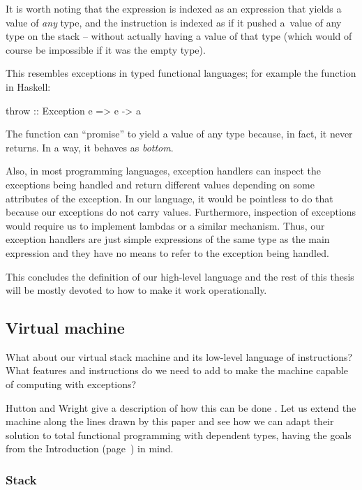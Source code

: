 It is worth noting that the expression  is indexed as an expression
that yields a value of \emph{any} type, and the instruction  is indexed
as if it pushed a~value of any type on the stack -- without actually having a value
of that type (which would of course be impossible if it was the empty type).

This resembles exceptions in typed functional languages; for example the function
 in Haskell:
\begin{code}
  throw :: Exception e => e -> a
\end{code}
The function  can ``promise'' to yield a value of any type because,
in fact, it never returns. In a way, it behaves as \emph{bottom}.

Also, in most programming languages, exception handlers can inspect the
exceptions being handled and return different values depending on some
attributes of the exception. In our language, it would be pointless to do that
because our exceptions do not carry values.  Furthermore, inspection of
exceptions would require us to implement lambdas or a similar mechanism.  Thus,
our exception handlers are just simple expressions of the same type as the main
expression and they have no means to refer to the exception being handled.

This concludes the definition of our high-level language and the rest of this thesis
will be mostly devoted to how to make it work operationally.

\subsection{Virtual machine}
\label{sec:own-execution-gmh}

What about our virtual stack machine and its low-level language of
instructions? What features and instructions do we need to add to make the
machine capable of computing with exceptions?

Hutton and Wright give a description of how this can be done \cite{gmh:exceptions}.
Let us extend the machine along the lines drawn by this paper and see
how we can adapt their solution to total functional programming with dependent
types, having the goals from the Introduction (page~\pageref{objectives}) in
mind.

\subsubsection{Stack}

